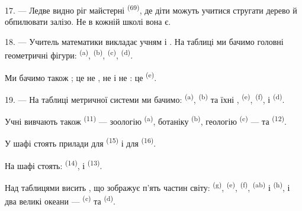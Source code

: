 17. --- Ледве видно ріг майстерні  \textsuperscript{(69)},
де діти можуть учитися стругати дерево й обпилювати залізо. Не в кожній школі
вона є.

\VUsaut{5.0mm}
\VUsaut{3.6mm}

18. --- Учитель математики викладає учням   і . На таблиці ми бачимо головні геометричні
фігури:  \textsuperscript{(a)}, 
\textsuperscript{(b)},  \textsuperscript{(c)},
 \textsuperscript{(d)}.

Ми бачимо також ; це не , не  і
не : це  \textsuperscript{(e)}.

19. --- На таблиці метричної системи ми бачимо: 
\textsuperscript{(a)},  \textsuperscript{(b)} та їхні
,  \textsuperscript{(e)}, 
\textsuperscript{(f)},  і 
\textsuperscript{(d)}.

Учні вивчають також  \textsuperscript{(11)} ---
зоологію \textsuperscript{(a)}, ботаніку \textsuperscript{(b)}, геологію
\textsuperscript{(c)} --- та  \textsuperscript{(12)}.

У шафі стоять прилади для  \textsuperscript{(15)} і для
 \textsuperscript{(16)}.

На шафі стоять:  \textsuperscript{(14)},  і
 \textsuperscript{(13)}.

Над таблицями висить , що зображує п'ять частин світу:
 \textsuperscript{(g)},  \textsuperscript{(e)},
 \textsuperscript{(f)},  \textsuperscript{(ab)} і
 \textsuperscript{(h)}, і два великі океани ---
 \textsuperscript{(c)} та 
\textsuperscript{(d)}.
\VUsaut{6.0mm}
\VUfilet{22mm}
